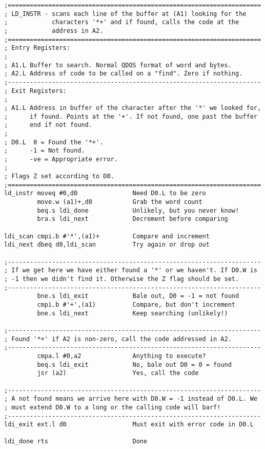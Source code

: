 \begin{lstlisting}[firstnumber=1,]
;=====================================================================
; LD_INSTR - scans each line of the buffer at (A1) looking for the 
;            characters '*+' and if found, calls the code at the 
;            address in A2.
;=====================================================================
; Entry Registers:
;
; A1.L Buffer to search. Normal QDOS format of word and bytes.
; A2.L Address of code to be called on a "find". Zero if nothing.
;---------------------------------------------------------------------
; Exit Registers:
;
; A1.L Address in buffer of the character after the '*' we looked for,
;      if found. Points at the '+'. If not found, one past the buffer
;      end if not found.
;
; D0.L  0 = Found the '*+'.
;      -1 = Not found.
;      -ve = Appropriate error.   
;
; Flags Z set according to D0.
;=====================================================================
ld_instr moveq #0,d0               Need D0.L to be zero
         move.w (a1)+,d0           Grab the word count
         beq.s ldi_done            Unlikely, but you never know!
         bra.s ldi_next            Decrement before comparing

ldi_scan cmpi.b #'*',(a1)+         Compare and increment
ldi_next dbeq d0,ldi_scan          Try again or drop out

;---------------------------------------------------------------------
; If we get here we have either found a '*' or we haven't. If D0.W is
; -1 then we didn't find it. Otherwise the Z flag should be set.
;---------------------------------------------------------------------
         bne.s ldi_exit            Bale out, D0 = -1 = not found
         cmpi.b #'+',(a1)          Compare, but don't increment
         bne.s ldi_next            Keep searching (unlikely!)

;---------------------------------------------------------------------
; Found '*+' if A2 is non-zero, call the code addressed in A2.
;---------------------------------------------------------------------
         cmpa.l #0,a2              Anything to execute?
         beq.s ldi_exit            No, bale out D0 = 0 = found
         jsr (a2)                  Yes, call the code

;---------------------------------------------------------------------
; A not found means we arrive here with D0.W = -1 instead of D0.L. We
; must extend D0.W to a long or the calling code will barf! 
;---------------------------------------------------------------------
ldi_exit ext.l d0                  Must exit with error code in D0.L

ldi_done rts                       Done
\end{lstlisting}

